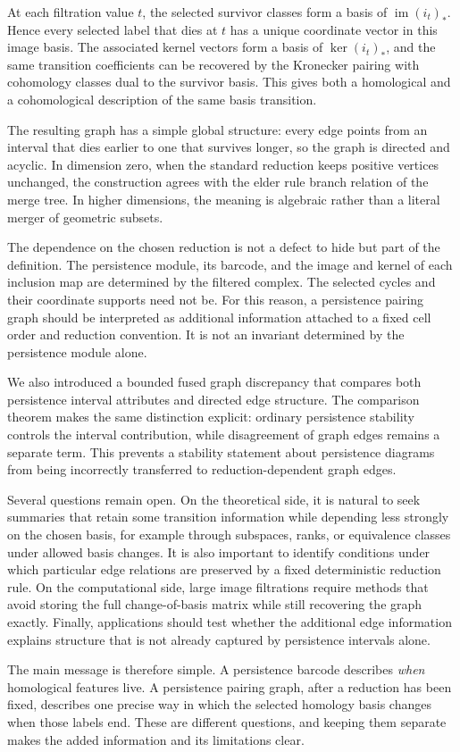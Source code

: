 \documentclass[11pt]{article}
\theoremstyle{paperdefinition}
\theoremstyle{paperplain}
\theoremstyle{paperremark}
\begin{document}
At each filtration value $t$, the selected survivor classes form a basis of $\operatorname{im}(i_t)_*$. Hence every selected label that dies at $t$ has a unique coordinate vector in this image basis. The associated kernel vectors form a basis of $\ker(i_t)_*$, and the same transition coefficients can be recovered by the Kronecker pairing with cohomology classes dual to the survivor basis. This gives both a homological and a cohomological description of the same basis transition.

The resulting graph has a simple global structure: every edge points from an interval that dies earlier to one that survives longer, so the graph is directed and acyclic. In dimension zero, when the standard reduction keeps positive vertices unchanged, the construction agrees with the elder rule branch relation of the merge tree. In higher dimensions, the meaning is algebraic rather than a literal merger of geometric subsets.

The dependence on the chosen reduction is not a defect to hide but part of the definition. The persistence module, its barcode, and the image and kernel of each inclusion map are determined by the filtered complex. The selected cycles and their coordinate supports need not be. For this reason, a persistence pairing graph should be interpreted as additional information attached to a fixed cell order and reduction convention. It is not an invariant determined by the persistence module alone.

We also introduced a bounded fused graph discrepancy that compares both persistence interval attributes and directed edge structure. The comparison theorem makes the same distinction explicit: ordinary persistence stability controls the interval contribution, while disagreement of graph edges remains a separate term. This prevents a stability statement about persistence diagrams from being incorrectly transferred to reduction-dependent graph edges.

Several questions remain open. On the theoretical side, it is natural to seek summaries that retain some transition information while depending less strongly on the chosen basis, for example through subspaces, ranks, or equivalence classes under allowed basis changes. It is also important to identify conditions under which particular edge relations are preserved by a fixed deterministic reduction rule. On the computational side, large image filtrations require methods that avoid storing the full change-of-basis matrix while still recovering the graph exactly. Finally, applications should test whether the additional edge information explains structure that is not already captured by persistence intervals alone.

The main message is therefore simple. A persistence barcode describes \emph{when} homological features live. A persistence pairing graph, after a reduction has been fixed, describes one precise way in which the selected homology basis changes when those labels end. These are different questions, and keeping them separate makes the added information and its limitations clear.



\end{document}
